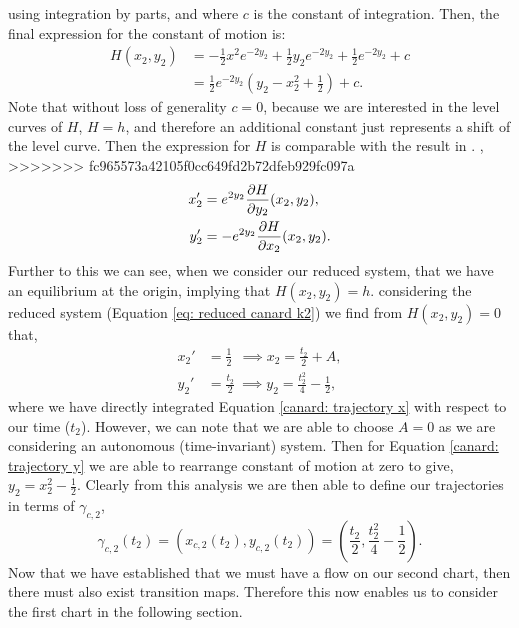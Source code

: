 using integration by parts, and where $c$ is the constant of integration.
Then, the final expression for the constant of motion is:
\begin{align*}
H(x_2,y_2)&=- \frac{1}{2} x^2 e^{-2y_2} + \frac{1}{2} y_2 e^{-2y_2} + \frac{1}{2} e^{-2y_2} + c\\
&= \frac{1}{2}e^{-2y_2}\left(y_2-x^2_2+\frac{1}{2}\right) +c.
\end{align*}
Note that without loss of generality $c=0$, because we are interested in the level curves of $H$, $H=h$, and therefore an additional constant just represents a shift of the level curve. Then the expression for $H$ is comparable with the result in \citet{krupa}.
,
>>>>>>> fc965573a42105f0cc649fd2b72dfeb929fc097a
\begin{subequations}
	\begin{align}
	x'_2&=e^{2y_2}\pd{H}{y_2}(x_2,y_2),\\
	y_2'&=-e^{2y_2}\pd{H}{x_2}(x_2,y_2).
	\end{align}
\end{subequations}
Further to this we can see, when we consider our reduced system, that we have an equilibrium at the origin, implying that $H(x_2,y_2)=h$.
considering the reduced system (Equation \ref{eq: reduced canard k2}) we find from $ H(x_2,y_2)=0 $ that,
\begin{subequations}
	\begin{align}
	x_2'&=\frac{1}{2}\ \	\implies x_2=\frac{t_2}{2}+A, \label{canard: trajectory x}\\
	y_2'&=\frac{t_2}{2}\ \implies y_2=\frac{t_2^2}{4}-\frac{1}{2}, \label{canard: trajectory y}
	\end{align}
\end{subequations} 
where we have directly integrated Equation \ref{canard: trajectory x} with respect to our time ($ t_2 $). However, we can note that we are able to choose $ A=0 $ as we are considering an autonomous (time-invariant) system. Then for Equation \ref{canard: trajectory y} we are able to rearrange constant of motion at zero to give, $ y_2=x_2^2-\frac{1}{2} $. Clearly from this analysis we are then able to define our trajectories in terms of $ \gamma_{c,2} $, 
\begin{equation}
\gamma_{c,2}(t_2)=(x_{c,2}(t_2),y_{c,2}(t_2))=\left(\frac{t_2}{2},\frac{t^2_2}{4}-\frac{1}{2}\right).   
\end{equation}
Now that we have established that we must have a flow on our second chart, then there must also exist transition maps. Therefore this now enables us to consider the first chart in the following section.


